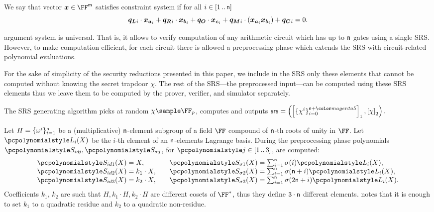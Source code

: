 We say that vector $\vx \in \FF^\noofw$ satisfies constraint system if for all $i
\in [1 \, .. \, \mathsf{n}]$
\[
  \vql_i \cdot \vx_{\va_i} + \vqr_i \cdot \vx_{\vb_i} + \vqo \cdot \vx_{\vc_i} +
  \vqm_i \cdot (\vx_{\va_i} \vx_{\vb_i}) + \vqc_i = 0. 
\]

\label{sec:plonk_explained}
\plonk{} argument system is universal. That is, it allows to verify computation
of any arithmetic circuit which has up to $\mathsf{n}$
gates using a single SRS. However, to make computation efficient, for each
circuit there is allowed a preprocessing phase which extends the SRS with
circuit-related polynomial evaluations.

For the sake of simplicity of the security reductions presented in this paper, we
include in the SRS only these elements that cannot be computed without knowing
the secret trapdoor $\chi$. The rest of the SRS---the preprocessed input---can
be computed using these SRS elements thus we leave them to be computed by the
prover, verifier, and simulator separately.

The SRS generating algorithm picks at random $\chi \sample \FF_p$, computes
and outputs
\(
	\srs = \left(\gone{\smallset{\chi^i}_{i = 0}^{\numberofconstrains + \changedm{5}}},
	\gtwo{\chi} \right).
\)

Let $H = \{\omega^i\}_{i = 1}^{\mathsf{n} }$ be a
(multiplicative) $\mathsf{n}$-element subgroup of a field $\FF$
compound of $\mathsf{n}$-th roots of unity in $\FF$. Let $\lag_i(X)$ be
the $i$-th element of an $\mathsf{n}$-elements Lagrange basis. During
the preprocessing phase polynomials $\p{S_{id j}}, \p{S_{\sigma j}}$, for
$\p{j} \in \range{1}{3}$, are computed:
\begin{equation*}
  \begin{aligned}
    \p{S_{id 1}}(X) & = X,\\[\myskip]
    \p{S_{id 2}}(X) & = k_1 \cdot X,\\[\myskip]
    \p{S_{id 3}}(X) & = k_2 \cdot X,
  \end{aligned}
  \qquad
\begin{aligned}
  \p{S_{\sigma 1}}(X) & = {\textstyle{\sum_{i = 1}^{\noofc} \sigma(i) \lag_i(X)}},\\[\myskip]
  \p{S_{\sigma 2}}(X) & = {\textstyle \sum_{i = 1}^{\noofc}
  \sigma(\noofc + i) \lag_i(X)},\\[\myskip]
  \p{S_{\sigma 3}}(X) & ={\textstyle\sum_{i = 1}^{\noofc} \sigma(2 \noofc + i) \lag_i(X)}.
\end{aligned}
\end{equation*}
Coefficients $k_1$, $k_2$ are such that $H, k_1 \cdot H, k_2 \cdot H$ are
different cosets of $\FF^*$, thus they define $3 \cdot \mathsf{n}$
different elements. \cite{EPRINT:GabWilCio19} notes that it is enough to set
$k_1$ to a quadratic residue and $k_2$ to a quadratic non-residue.

